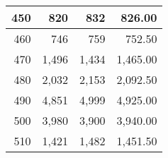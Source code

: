 \begin{longtable}{|r|r|r|r|}
		450                                                                                                                   & 820                                                  & 832                                                  & 826.00                                                                                                                 \\ \hline
		460                                                                                                                   & 746                                                  & 759                                                  & 752.50                                                                                                                 \\ \hline
		470                                                                                                                   & 1,496                                                & 1,434                                                & 1,465.00                                                                                                               \\ \hline
		480                                                                                                                   & 2,032                                                & 2,153                                                & 2,092.50                                                                                                               \\ \hline
		490                                                                                                                   & 4,851                                                & 4,999                                                & 4,925.00                                                                                                               \\ \hline
		500                                                                                                                   & 3,980                                                & 3,900                                                & 3,940.00                                                                                                               \\ \hline
		510                                                                                                                   & 1,421                                                & 1,482                                                & 1,451.50                                                                                                               \\ \hline

\end{longtable}
